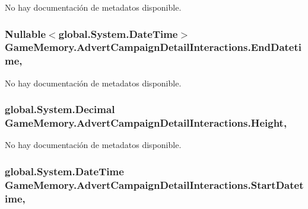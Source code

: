 No hay documentación de metadatos disponible. 

\hypertarget{class_game_memory_1_1_advert_campaign_detail_interactions_a9903b1858d25ea52b6a58652e38af39c}{
\subsubsection[{End\-Datetime}]{\setlength{\rightskip}{0pt plus 5cm}Nullable$<$global.\-System.\-Date\-Time$>$ Game\-Memory.\-Advert\-Campaign\-Detail\-Interactions.\-End\-Datetime\hspace{0.3cm}{\ttfamily [get]}, {\ttfamily [set]}}}\label{class_game_memory_1_1_advert_campaign_detail_interactions_a9903b1858d25ea52b6a58652e38af39c}


No hay documentación de metadatos disponible. 

\hypertarget{class_game_memory_1_1_advert_campaign_detail_interactions_a10fb8d682b9d3fc999011bb92a2e44f5}{
\subsubsection[{Height}]{\setlength{\rightskip}{0pt plus 5cm}global.\-System.\-Decimal Game\-Memory.\-Advert\-Campaign\-Detail\-Interactions.\-Height\hspace{0.3cm}{\ttfamily [get]}, {\ttfamily [set]}}}\label{class_game_memory_1_1_advert_campaign_detail_interactions_a10fb8d682b9d3fc999011bb92a2e44f5}


No hay documentación de metadatos disponible. 

\hypertarget{class_game_memory_1_1_advert_campaign_detail_interactions_a2c4b07307a18acd8fbeb59159b8db65e}{
\subsubsection[{Start\-Datetime}]{\setlength{\rightskip}{0pt plus 5cm}global.\-System.\-Date\-Time Game\-Memory.\-Advert\-Campaign\-Detail\-Interactions.\-Start\-Datetime\hspace{0.3cm}{\ttfamily [get]}, {\ttfamily [set]}}}\label{class_game_memory_1_1_advert_campaign_detail_interactions_a2c4b07307a18acd8fbeb59159b8db65e}


